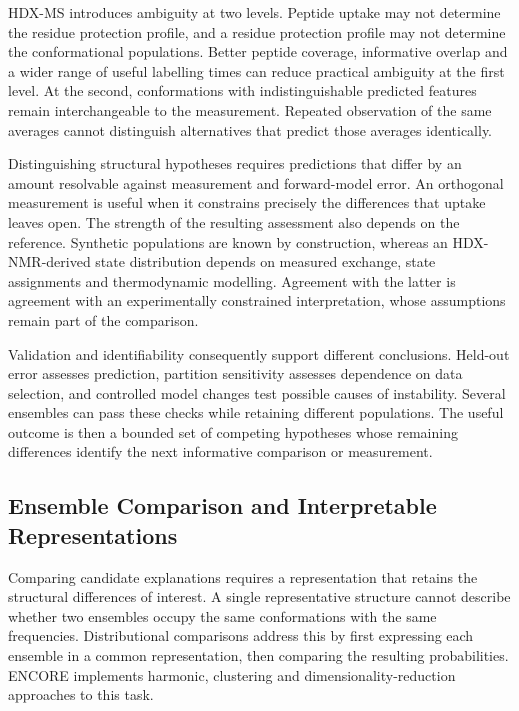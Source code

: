 HDX-MS introduces ambiguity at two levels. Peptide uptake may not determine the residue protection profile, and a residue protection profile may not determine the conformational populations. Better peptide coverage, informative overlap and a wider range of useful labelling times can reduce practical ambiguity at the first level.\supercite{skinnerEstimatingConstraintsProtection2019} At the second, conformations with indistinguishable predicted features remain interchangeable to the measurement. Repeated observation of the same averages cannot distinguish alternatives that predict those averages identically.

Distinguishing structural hypotheses requires predictions that differ by an amount resolvable against measurement and forward-model error. An orthogonal measurement is useful when it constrains precisely the differences that uptake leaves open. The strength of the resulting assessment also depends on the reference. Synthetic populations are known by construction, whereas an HDX-NMR-derived state distribution depends on measured exchange, state assignments and thermodynamic modelling.\supercite{moulickPartiallyUnfoldedForms2015} Agreement with the latter is agreement with an experimentally constrained interpretation, whose assumptions remain part of the comparison.

Validation and identifiability consequently support different conclusions. Held-out error assesses prediction, partition sensitivity assesses dependence on data selection, and controlled model changes test possible causes of instability. Several ensembles can pass these checks while retaining different populations. The useful outcome is then a bounded set of competing hypotheses whose remaining differences identify the next informative comparison or measurement.

\subsection{Ensemble Comparison and Interpretable Representations}
\label{sec:bg-ensemble-comparison}

Comparing candidate explanations requires a representation that retains the structural differences of interest. A single representative structure cannot describe whether two ensembles occupy the same conformations with the same frequencies. Distributional comparisons address this by first expressing each ensemble in a common representation, then comparing the resulting probabilities. ENCORE implements harmonic, clustering and dimensionality-reduction approaches to this task.\supercite{lindorff-larsenSimilarityMeasuresProtein2009,tibertiENCORESoftwareQuantitative2015}

